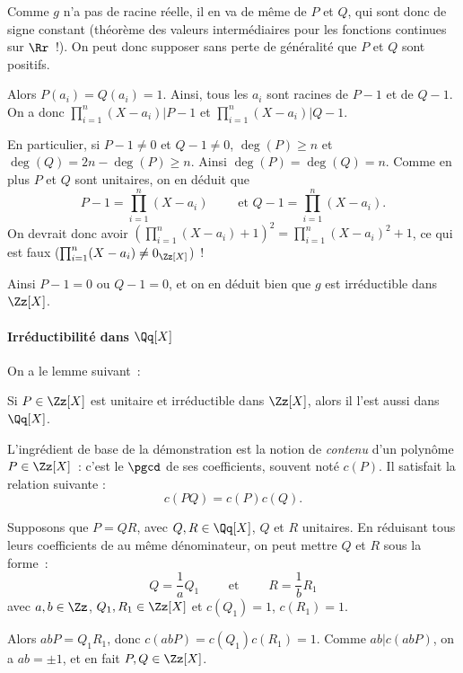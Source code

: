 {{  Comme $g$ n'a pas de racine réelle, il en va de même de $P$ et $Q$, qui
  sont donc de signe constant (théorème des valeurs intermédiaires pour
  les fonctions continues sur $\Rr$~!). On peut donc supposer sans perte
  de généralité que $P$ et $Q$ sont positifs.

  Alors $P(a_{i})=Q(a_{i})=1$. Ainsi, tous les $a_{i}$ sont racines de
  $P-1$ et de $Q-1$. On a donc $\prod_{i=1}^{n}(X-a_{i})|P-1$ et
  $\prod_{i=1}^{n}(X-a_{i})|Q-1$.

  En particulier, si $P-1\neq0$ et $Q-1\neq0$, $\deg(P)\geq n$ et
  $\deg(Q)=2n-\deg(P)\geq n$. Ainsi $\deg(P)=\deg(Q)=n$. Comme en plus
  $P$ et $Q$ sont unitaires, on en déduit que 
  $$
    P-1=\prod_{i=1}^{n}(X-a_{i}) \qquad\text{ et }
    Q-1=\prod_{i=1}^{n}(X-a_{i}).
  $$
  On devrait donc avoir
  $(\prod_{i=1}^{n}(X-a_{i})+1)^{2}=\prod_{i=1}^{n}(X-a_{i})^{2}+1$, ce
  qui est faux ($\prod_{i=1}^{n}(X-a_{i})\neq 0_{\Zz[X]}$)~!

  Ainsi $P-1=0$ ou $Q-1=0$, et on en déduit bien que $g$ est irréductible
  dans $\Zz[X]$.


  
  \bigskip
  \paragraph{Irréductibilité dans $\Qq[X]$}
 On a le lemme suivant~:

  Si $P\in\Zz[X]$ est unitaire et irréductible dans $\Zz[X]$, alors il
  l'est aussi dans $\Qq[X]$.

  L'ingrédient de base de la démonstration est la notion de
  \emph{contenu} d'un polynôme $P\in\Zz[X]$~: c'est le $\pgcd$ de ses
  coefficients, souvent noté $c(P)$. Il satisfait la relation suivante :
  $$
    c(PQ)=c(P)c(Q).
  $$

  Supposons que $P=QR$, avec $Q,R\in\Qq[X]$, $Q$ et $R$ unitaires. En
  réduisant tous leurs coefficients de au même dénominateur, on peut
  mettre $Q$ et $R$ sous la forme~:
  $$
    Q=\frac{1}{a}Q_{1} 
    \qquad\text{ et }\qquad
    R=\frac{1}{b}R_{1} 
  $$
  avec $a,b\in\Zz$, $Q_{1},R_{1}\in\Zz[X]$ et $c(Q_{1})=1$, $c(R_{1})=1$.

  Alors $abP=Q_{1}R_{1}$, donc $c(abP)=c(Q_{1})c(R_{1})=1$. Comme
  $ab|c(abP)$, on a $ab=\pm1$, et en fait $P,Q\in\Zz[X]$.
}
}
